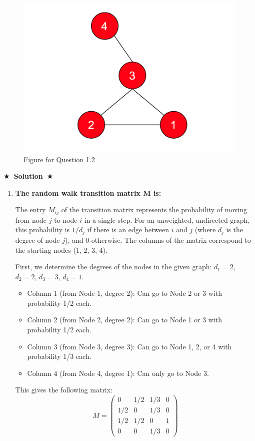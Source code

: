 \documentclass{article}
\numberwithin{figure}{section}
\newcommand{\Solution}[1]{%
	{%
		\medskip
		\color{red}
		\bf $\bigstar$~\sf\textbf{Solution}~$\bigstar$ \sf
		#1
	}
	\bigskip
}
\begin{document}
	\begin{figure}[!htb]
		\centering
		\includegraphics[width=0.5\columnwidth]{fig4-2.png}
		\caption{Figure for Question 1.2}
		\label{fig:Q4.2}
	\end{figure}
	
	\Solution{
		\begin{enumerate}
			\item \textbf{The random walk transition matrix M is:}
			
			The entry $M_{ij}$ of the transition matrix represents the probability of moving from node $j$ to node $i$ in a single step. For an unweighted, undirected graph, this probability is $1/d_j$ if there is an edge between $i$ and $j$ (where $d_j$ is the degree of node $j$), and 0 otherwise. The columns of the matrix correspond to the starting nodes (1, 2, 3, 4).
			
			First, we determine the degrees of the nodes in the given graph: $d_1=2$, $d_2=2$, $d_3=3$, $d_4=1$.
			
			\begin{itemize}
				\item Column 1 (from Node 1, degree 2): Can go to Node 2 or 3 with probability 1/2 each.
				\item Column 2 (from Node 2, degree 2): Can go to Node 1 or 3 with probability 1/2 each.
				\item Column 3 (from Node 3, degree 3): Can go to Node 1, 2, or 4 with probability 1/3 each.
				\item Column 4 (from Node 4, degree 1): Can only go to Node 3.
			\end{itemize}
			
			This gives the following matrix:
			\[
			M = 
			\begin{pmatrix}
				0 & 1/2 & 1/3 & 0 \\
				1/2 & 0 & 1/3 & 0 \\
				1/2 & 1/2 & 0 & 1 \\
				0 & 0 & 1/3 & 0
			\end{pmatrix}
			\]
			

\end{enumerate}}
\end{document}
